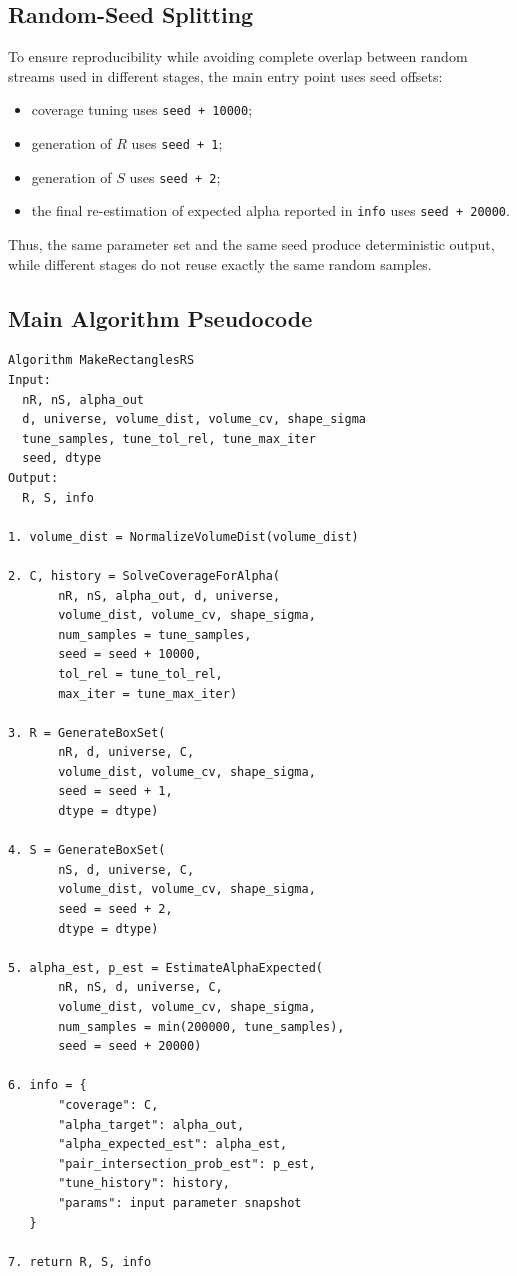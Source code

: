 \documentclass[11pt,a4paper]{article}
\newcommand{\code}[1]{\texttt{#1}}
\begin{document}
\subsection{Random-Seed Splitting}

To ensure reproducibility while avoiding complete overlap between random streams used in different stages, the main entry point uses seed offsets:
\begin{itemize}
  \item coverage tuning uses \code{seed + 10000};
  \item generation of $R$ uses \code{seed + 1};
  \item generation of $S$ uses \code{seed + 2};
  \item the final re-estimation of expected alpha reported in \code{info} uses \code{seed + 20000}.
\end{itemize}
Thus, the same parameter set and the same seed produce deterministic output, while different stages do not reuse exactly the same random samples.

\subsection{Main Algorithm Pseudocode}

\begin{verbatim}
Algorithm MakeRectanglesRS
Input:
  nR, nS, alpha_out
  d, universe, volume_dist, volume_cv, shape_sigma
  tune_samples, tune_tol_rel, tune_max_iter
  seed, dtype
Output:
  R, S, info

1. volume_dist = NormalizeVolumeDist(volume_dist)

2. C, history = SolveCoverageForAlpha(
       nR, nS, alpha_out, d, universe,
       volume_dist, volume_cv, shape_sigma,
       num_samples = tune_samples,
       seed = seed + 10000,
       tol_rel = tune_tol_rel,
       max_iter = tune_max_iter)

3. R = GenerateBoxSet(
       nR, d, universe, C,
       volume_dist, volume_cv, shape_sigma,
       seed = seed + 1,
       dtype = dtype)

4. S = GenerateBoxSet(
       nS, d, universe, C,
       volume_dist, volume_cv, shape_sigma,
       seed = seed + 2,
       dtype = dtype)

5. alpha_est, p_est = EstimateAlphaExpected(
       nR, nS, d, universe, C,
       volume_dist, volume_cv, shape_sigma,
       num_samples = min(200000, tune_samples),
       seed = seed + 20000)

6. info = {
       "coverage": C,
       "alpha_target": alpha_out,
       "alpha_expected_est": alpha_est,
       "pair_intersection_prob_est": p_est,
       "tune_history": history,
       "params": input parameter snapshot
   }

7. return R, S, info
\end{verbatim}
\end{document}

